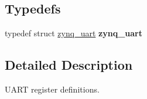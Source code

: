 \subsection*{Typedefs}
\begin{DoxyCompactItemize}
\item 
typedef struct \mbox{\hyperlink{structzynq__uart}{zynq\+\_\+uart}} {\bfseries zynq\+\_\+uart}
\end{DoxyCompactItemize}


\subsection{Detailed Description}
U\+A\+RT register definitions. 

